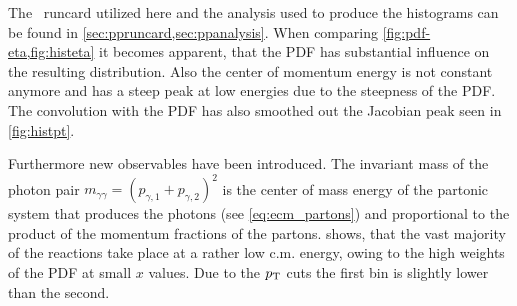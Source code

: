 The \sherpa\ runcard utilized here and the analysis used to produce
the histograms can be found in
\cref{sec:ppruncard,sec:ppanalysis}. When comparing
\cref{fig:pdf-eta,fig:histeta} it becomes apparent, that the PDF has
substantial influence on the resulting distribution. Also the center
of momentum energy is not constant anymore and has a steep peak at low
energies due to the steepness of the PDF. The convolution with the PDF
has also smoothed out the Jacobian peak seen in \cref{fig:histpt}.

Furthermore new observables have been introduced.  The invariant mass
of the photon pair
\(m_{\gamma\gamma} = (p_{\gamma,1} + p_{\gamma,2})^2\) is the center
of mass energy of the partonic system that produces the photons (see
\cref{eq:ecm_partons}) and proportional to the product of the momentum
fractions of the partons.  shows, that the vast
majority of the reactions take place at a rather low c.m. energy,
owing to the high weights of the PDF at small \(x\) values. Due to the
\(p_\mathrm{T}\) cuts the first bin is slightly lower than the second.

